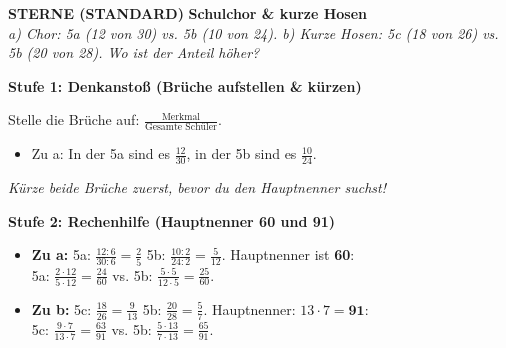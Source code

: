 \documentclass[a4paper,10pt]{article}
\newcommand{\mFrac}[2]{\frac{#1}{#2}}
\begin{document}
\begin{tcolorbox}[
    enhanced, colback=white, colframe=primaryBlue, arc=3mm, boxrule=1.2pt,
    left=4.5mm, right=4.5mm, top=2.5mm, bottom=2.5mm, height=12.9cm
]
    \begin{center}
        {\color{lvlBlue}\textbf{\faStar\faStar{} STERNE (STANDARD)}}\quad
        {\color{primaryBlue}\large\bfseries {}\quad Schulchor \& kurze Hosen}\\[1mm]
        {\footnotesize\textit{a) Chor: 5a (12 von 30) vs. 5b (10 von 24). \quad b) Kurze Hosen: 5c (18 von 26) vs. 5b (20 von 28). Wo ist der Anteil höher?}}
    \end{center}
    \vspace{0.5mm}

    \begin{tcolorbox}[colback=step1Bg, colframe=step1Border, arc=2mm, boxrule=0.7pt, left=3mm, right=3mm, top=1.8mm, bottom=1.8mm]
        {\color{step1Text}\bfseries\faLightbulb\enskip Stufe 1: Denkanstoß (Brüche aufstellen \& kürzen)}\\[0.8mm]
        {\small
        Stelle die Brüche auf: $\mFrac{\text{Merkmal}}{\text{Gesamte Schüler}}$.
        \begin{itemize}[leftmargin=4mm, itemsep=0.2pt, topsep=1pt]
            \item Zu a: In der 5a sind es $\mFrac{12}{30}$, in der 5b sind es $\mFrac{10}{24}$.
        \end{itemize}
        {\color{step1Text}\faHandPointRight}\enskip \textit{Kürze beide Brüche zuerst, bevor du den Hauptnenner suchst!}
        }
    \end{tcolorbox}
    \vspace{0.8mm}

    \begin{tcolorbox}[colback=step2Bg, colframe=step2Border, arc=2mm, boxrule=0.7pt, left=3mm, right=3mm, top=1.8mm, bottom=1.8mm]
        {\color{step2Text}\bfseries\faSearch\enskip Stufe 2: Rechenhilfe (Hauptnenner 60 und 91)}\\[0.8mm]
        {\small
        \begin{itemize}[leftmargin=4mm, itemsep=0.2pt, topsep=1pt]
            \item \textbf{Zu a:} 5a: $\mFrac{12:6}{30:6} = \mFrac{2}{5}$ \quad 5b: $\mFrac{10:2}{24:2} = \mFrac{5}{12}$. Hauptnenner ist \textbf{60}:\\
            5a: $\mFrac{2\cdot 12}{5\cdot 12} = \mFrac{24}{60}$ \quad vs. \quad 5b: $\mFrac{5\cdot 5}{12\cdot 5} = \mFrac{25}{60}$.
            \item \textbf{Zu b:} 5c: $\mFrac{18}{26} = \mFrac{9}{13}$ \quad 5b: $\mFrac{20}{28} = \mFrac{5}{7}$. Hauptnenner: $13\cdot 7 = \textbf{91}$:\\
            5c: $\mFrac{9\cdot 7}{13\cdot 7} = \mFrac{63}{91}$ \quad vs. \quad 5b: $\mFrac{5\cdot 13}{7\cdot 13} = \mFrac{65}{91}$.
        \end{itemize}
        }
    \end{tcolorbox}
    \vspace{0.8mm}


\end{tcolorbox}
\end{document}
